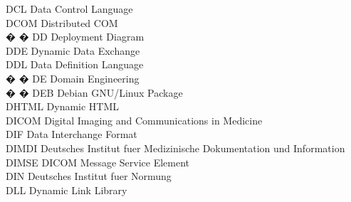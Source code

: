 \begin{tabbing}

    \>DCL \>\>Data Control Language\\

    \>DCOM \>\>Distributed COM\\

� � \>DD \>\>Deployment Diagram\\

    \>DDE \>\>Dynamic Data Exchange\\

    \>DDL \>\>Data Definition Language\\



� � \>DE \>\>Domain Engineering\\

� � \>DEB \>\>Debian GNU/Linux Package\\



    \>DHTML \>\>Dynamic HTML\\

    \>DICOM \>\>Digital Imaging and Communications in Medicine\\

    \>DIF \>\>Data Interchange Format\\

    \>DIMDI \>\>Deutsches Institut fuer Medizinische Dokumentation und Information\\

    \>DIMSE \>\>DICOM Message Service Element\\

    \>DIN \>\>Deutsches Institut fuer Normung\\



    \>DLL \>\>Dynamic Link Library\\


\end{tabbing}
